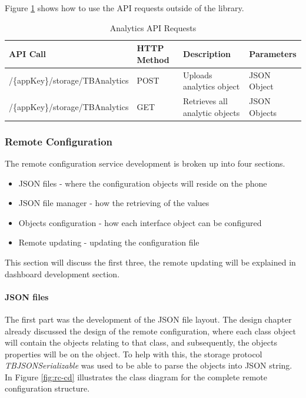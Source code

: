 Figure \ref{table:analytics} shows how to use the API requests outside of the library.

\begin{table}[!h]
\centering
\caption{Analytics API Requests}
\label{table:analytics}
\begin{tabular}{|l|l|l|l|}
\hline
\rowcolor{green!20}
API Call                        & HTTP Method & Description                    & Parameters   \\ \hline
/\{appKey\}/storage/TBAnalytics & POST        & Uploads analytics object       & JSON Object  \\ \hline
/\{appKey\}/storage/TBAnalytics & GET         & Retrieves all analytic objects & JSON Objects \\ \hline
\end{tabular}
\end{table}


\subsubsection{Remote Configuration} \label{dev:sub_rc}

The remote configuration service development is broken up into four sections.

\begin{itemize}
  \item JSON files 
  - where the configuration objects will reside on the phone
  \item JSON file manager
  - how the retrieving of the values
  \item Objects configuration
  - how each interface object can be configured
  \item Remote updating
  - updating the configuration file
\end{itemize}

This section will discuss the first three, the remote updating will be explained in dashboard development section.

\paragraph{JSON files}

The first part was the development of the JSON file layout. The design chapter already discussed the design of the remote configuration, where each class object will contain the objects relating to that class, and subsequently, the objects properties will be on the object. To help with this, the storage protocol \textit{TBJSONSerializable} was used to be able to parse the objects into JSON string. In Figure \ref{fig:rc-cd} illustrates the class diagram for the complete remote configuration structure.

